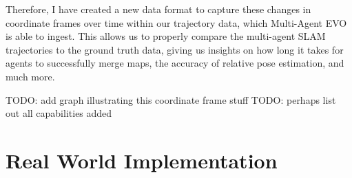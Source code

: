 Therefore, I have created a new data format to capture these changes in coordinate frames over time within our trajectory data, which Multi-Agent EVO is able to ingest. This allows us to properly compare the multi-agent SLAM trajectories to the ground truth data, giving us insights on how long it takes for agents to successfully merge maps, the accuracy of relative pose estimation, and much more.

TODO: add graph illustrating this coordinate frame stuff
TODO: perhaps list out all capabilities added

\section{Real World Implementation}
\label{sec:real-world-implementation}





